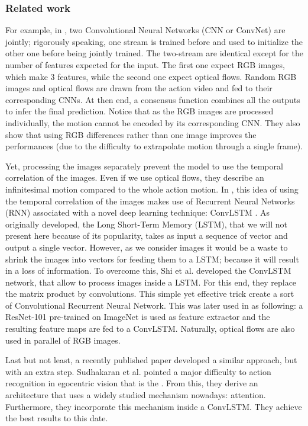 \documentclass[12pt, a4paper]{report}
\begin{document}
				\subsubsection{Related work}
				For example, in \cite{wang}, two Convolutional Neural Networks (CNN or ConvNet) are \gls{jointly}; rigorously speaking, one stream is trained before and used to initialize the other one before being jointly trained.
				The two-stream are identical except for the number of features expected for the input.
				The first one expect RGB images, which make 3 features, while the second one expect optical flows.
				Random RGB images and optical flows are drawn from the action video and fed to their corresponding CNNs.
				At then end, a consensus function combines all the outputs to infer the final prediction.
				Notice that as the RGB images are processed individually, the motion cannot be encoded by its corresponding CNN.
				They also show that using RGB differences rather than one image improves the performances (due to the difficulty to extrapolate motion through a single frame).\par
				Yet, processing the images separately prevent the model to use the temporal correlation of the images.
				Even if we use optical flows, they describe an infinitesimal motion compared to the whole action motion.
				In \cite{ye}, this idea of using the temporal correlation of the images makes use of Recurrent Neural Networks (RNN) associated with a novel deep learning technique: ConvLSTM \cite{shi}.
				As originally developed, the Long Short-Term Memory (LSTM), that we will not present here because of its popularity, takes as input a sequence of vector and output a single vector.
				However, as we consider images it would be a waste to shrink the images into vectors for feeding them to a LSTM; because it will result in a loss of information.
				To overcome this, Shi et al. developed the ConvLSTM network, that allow to process images inside a LSTM.
				For this end, they replace the matrix product by convolutions.
				This simple yet effective trick create a sort of Convolutional Recurrent Neural Network.
				This was later used in \cite{ye} as following: a ResNet-101 pre-trained on ImageNet is used as feature extractor and the resulting feature maps are fed to a ConvLSTM.
				Naturally, optical flows are also used in parallel of RGB images.\par
				Last but not least, a recently published paper developed a similar approach, but with an extra step.
				Sudhakaran et al. \cite{sudhakaran} pointed a major difficulty to action recognition in egocentric vision that is the .
				From this, they derive an architecture that uses a widely studied mechanism nowadays: attention.
				Furthermore, they incorporate this mechanism inside a ConvLSTM.  %
				They achieve the best results to this date.
\end{document}
